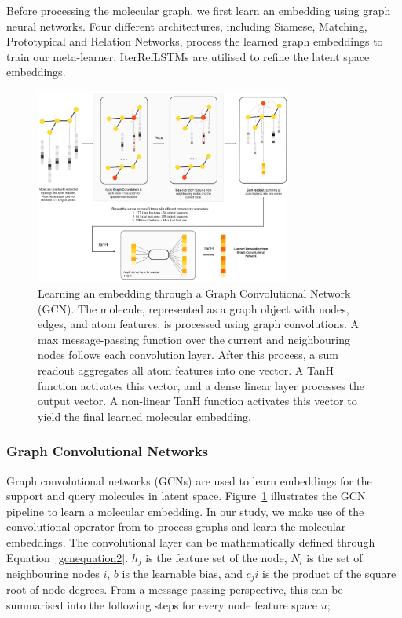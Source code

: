 \documentclass[journal=acscii,manuscript=article]{achemso}
\begin{document}
Before processing the molecular graph, we first learn an embedding using graph neural networks. Four different architectures, including Siamese, Matching, Prototypical and Relation Networks, process the learned graph embeddings to train our meta-learner. IterRefLSTMs are utilised to refine the latent space embeddings.

\begin{figure}
  \centering
  \includegraphics[width=0.75\textwidth]{img/DVGCNArchi.png}
  \caption{Learning an embedding through a Graph Convolutional Network (GCN). The molecule, represented as a graph object with nodes, edges, and atom features, is processed using graph convolutions. A max message-passing function over the current and neighbouring nodes follows each convolution layer. After this process, a sum readout aggregates all atom features into one vector. A TanH function activates this vector, and a dense linear layer processes the output vector. A non-linear TanH function activates this vector to yield the final learned molecular embedding.}
  \label{fig:dvgcnarchi}
\end{figure}

\subsubsection{Graph Convolutional Networks}

Graph convolutional networks (GCNs) are used to learn embeddings for the support and query molecules in latent space. Figure~\ref{fig:dvgcnarchi} illustrates the GCN pipeline to learn a molecular embedding. In our study, we make use of the convolutional operator from \citet{kipf2016semi} to process graphs and learn the molecular embeddings. The convolutional layer can be mathematically defined through Equation~\ref{gcnequation2}. $h_j$ is the feature set of the node, $N_i$ is the set of neighbouring nodes $i$, $b$ is the learnable bias, and $c_ji$ is the product of the square root of node degrees. From a message-passing perspective, this can be summarised into the following steps for every node feature space $u$;
\end{document}

